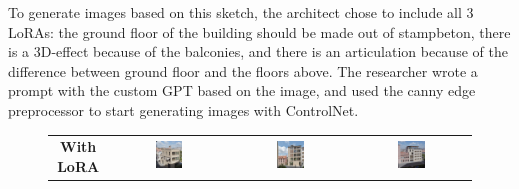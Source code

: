 To generate images based on this sketch, the architect chose to include all 3 LoRAs: the ground floor of the building should be made out of stampbeton, there is a 3D-effect because of the balconies, and there is an articulation because of the difference between ground floor and the floors above. The researcher wrote a prompt with the custom GPT based on the image, and used the canny edge preprocessor to start generating images with ControlNet.
\begin{figure}[H]
  \centering
  {\footnotesize
  \renewcommand{\arraystretch}{1.1}
  \setlength{\tabcolsep}{4pt}
  \begin{tabular}{c c c c}
    \textbf{With LoRA} &
    \includegraphics[width=0.25\textwidth]{Images/Results/Architect-A_unstructured-phase/generated_images/1/Met_lora_00001_.png} &
    \includegraphics[width=0.25\textwidth]{Images/Results/Architect-A_unstructured-phase/generated_images/1/Met_lora_00002_.png} &
    \includegraphics[width=0.25\textwidth]{Images/Results/Architect-A_unstructured-phase/generated_images/1/Met_lora_00005_.png} \\


\end{tabular}}
\end{figure}
